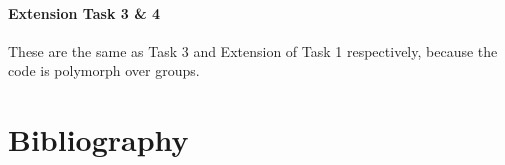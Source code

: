 \documentclass[submission,copyright,creativecommons]{eptcs}
\begin{document}
\paragraph{Extension Task 3 \& 4}

These are the same as Task 3 and Extension of Task 1 respectively,
because the code is polymorph over groups.

\section{Bibliography}

\nocite{*}


\end{document}
